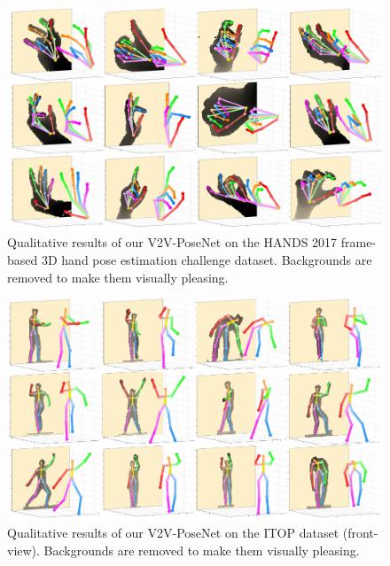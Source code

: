 \begin{figure}
\begin{center}
   \includegraphics[width=1.0\linewidth]{qualitative_hands2017.pdf}
\end{center}
\vspace*{-6mm}
   \caption{Qualitative results of our V2V-PoseNet on the HANDS 2017 frame-based 3D hand pose estimation challenge dataset. Backgrounds are removed to make them visually pleasing.}
\vspace*{-3mm}
\label{fig:qualitative_hands2017}
\end{figure}

\begin{figure}
\begin{center}
   \includegraphics[width=1.0\linewidth]{qualitative_itop_front.pdf}
\end{center}
\vspace*{-6mm}
   \caption{Qualitative results of our V2V-PoseNet on the ITOP dataset (front-view). Backgrounds are removed to make them visually pleasing.}
\vspace*{-3mm}
\label{fig:qualitative_itop_front}
\end{figure}

